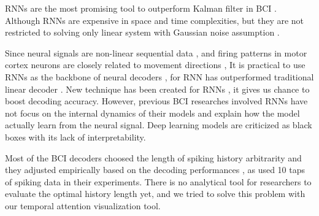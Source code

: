 RNNs are the most promising tool to outperform Kalman filter in BCI \citep{hosman2019bci}.
Although RNNs are expensive in space and time complexities, 
but they are not restricted to solving only linear system with Gaussian noise assumption \citep{chenna2004state}.


Since neural signals are non-linear sequential data \citep{brezina2000neuromuscular}, 
and firing patterns in motor cortex neurons are closely related to movement directions \citep{hatsopoulos1998information},
It is practical to use RNNs as the backbone of neural decoders \citep{buonomano2011population}, 
for RNN has outperformed traditional linear decoder \citep{sussillo2016making}.
New technique has been created for RNNs \citep{xu2019understanding}, 
it gives us chance to boost decoding accuracy.
However, previous BCI researches involved RNNs have not focus on the internal dynamics of their models and explain how the model actually learn from the neural signal.
Deep learning models are criticized as black boxes with its lack of interpretability.


Most of the BCI decoders choosed the length of spiking history arbitrarity and they adjusted empirically based on the decoding performances \citep{tseng2019decoding},
as \cite{li2009unscented, li2016improved} used 10 taps of spiking data in their experiments.
There is no analytical tool for researchers to evaluate the optimal history length yet,
and we tried to solve this problem with our temporal attention visualization tool.


